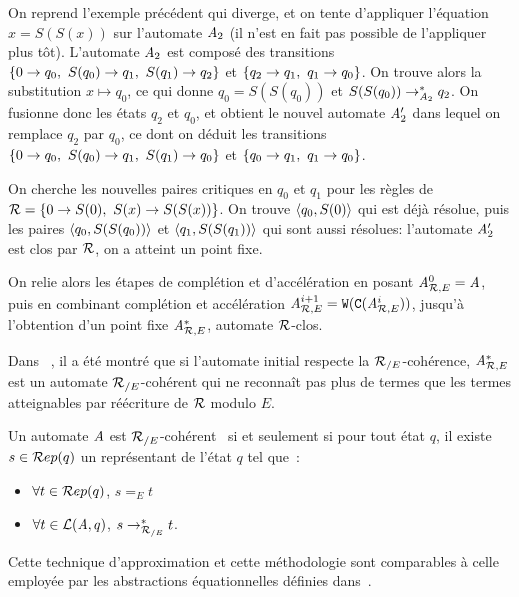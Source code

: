 \begin{example}
  On reprend l'exemple précédent qui diverge, et on tente d'appliquer l'équation $x = S(S(x))$ sur
  l'automate $\mathit A_2$ (il n'est en fait pas possible de l'appliquer plus tôt).
  L'automate $\mathit A_2$ est composé des transitions $\{ 0 \rightarrow q_0,\ S(q_0) \rightarrow q_1,\ S(q_1) \rightarrow q_2\}$
  et $\{ q_2 \rightarrow q_1,\ q_1 \rightarrow q_0\}$.
  On trouve alors la substitution $x \mapsto q_0$, ce qui donne $q_0 = S(S(q_0))$ et $S(S(q_0)) \rightarrow^*_{\mathit A_2} q_2$.
  On fusionne donc les états $q_2$ et $q_0$, et obtient le nouvel automate $\mathit A_2'$ dans lequel on remplace
  $q_2$ par $q_0$, ce dont on déduit les transitions $\{ 0 \rightarrow q_0,\ S(q_0) \rightarrow q_1,\ S(q_1) \rightarrow q_0\}$
  et $\{ q_0 \rightarrow q_1,\ q_1 \rightarrow q_0\}$.
  
  On cherche les nouvelles paires critiques en $q_0$ et $q_1$ pour les règles de $\mathcal R = \{0 \rightarrow S(0),\ S(x) \rightarrow S(S(x))\}$.
  On trouve $\langle q_0, S(0)\rangle$ qui est déjà résolue, puis les paires $\langle q_0,S(S(q_0))\rangle$ et $\langle q_1,S(S(q_1))\rangle$
  qui sont aussi résolues: l'automate $\mathit A_2'$ est clos par $\mathcal R$, on a atteint un point fixe.
\end{example}


On relie alors les étapes de complétion et d'accélération en posant ${\mathit A}_{\mathcal R,E}^0=\mathit A$, puis en combinant
complétion et accélération ${\mathit A}_{\mathcal R,E}^{i+1}= \mathtt{W}(\mathtt{C}({\mathit A}_{\mathcal R,E}^i))$, jusqu'à l'obtention d'un point fixe
$\mathit A^*_{\mathcal R,E}$, automate $\mathcal R$-clos.

Dans ~\cite{GenetR-JSC10}, il a été montré que si l'automate initial respecte la ${\mathcal R_{/E}}$-cohérence,
$\mathit A^*_{\mathcal R,E}$ est un automate ${\mathcal R_{/E}}$-cohérent qui ne reconnaît pas plus de termes que les termes atteignables
par réécriture de $\mathcal R$ modulo $E$.
\begin{definition}
  \label{def:re-coherence}
  Un automate $\mathit A$ est ${\mathcal R_{/E}}$-cohérent~\cite{GenetR-JSC10} si et seulement si pour tout état $q$, il existe 
  $s \in \mathcal R ep(q)$ un représentant de l'état $q$ tel que~:
  \begin{itemize}
  \item $\forall t \in \mathcal R ep(q)$, $s =_E t$
  \item $\forall t \in \mathcal{L}(\mathit A, q)$, $s \rightarrow_{\mathcal R_{/E}}^* t$.
  \end{itemize}
\end{definition}

Cette technique d'approximation et cette méthodologie sont comparables à celle employée 
par les abstractions équationnelles définies dans~\cite{MeseguerPM-TCS08}.


